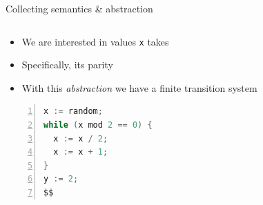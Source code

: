 \documentclass[aspectratio=169]{beamer}
\begin{document}
\begin{frame}[fragile]{Collecting semantics \& abstraction}
  \footnotesize
  \begin{columns}[T]
    \begin{column}{0.4\textwidth}
      \begin{itemize}
      \item We are interested in values \texttt{x} takes
      \item<9-> Specifically, its parity
      \item<15-> With this \emph{abstraction} we have a finite transition system
      \end{itemize}
      \begin{lstlisting}[language=Java,numbers=left,mathescape,basicstyle={\footnotesize\ttfamily}]
x := random;
while (x mod 2 == 0) {
  x := x / 2;
  x := x + 1;
}
y := 2;
$$
\end{lstlisting}
    \end{column}
    \begin{column}{0.6\textwidth}
    \end{column}
  \end{columns}
\end{frame}
\end{document}
